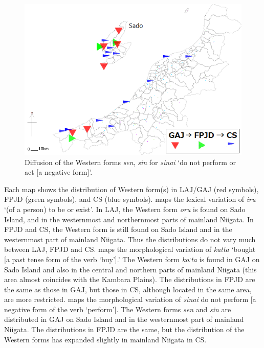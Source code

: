 \documentclass[output=paper]{LSP/langsci}
\begin{document}
\begin{figure}
\includegraphics[width=.75\textwidth]{illustrations/fuku2_fig2c}
\caption{Diffusion of the Western forms \textit{sen}, \textit{sin} for \textit{sinai} `do not perform or act [a negative form]'.}
\label{fig:2c}
\end{figure}

Each map shows the distribution of Western form(s) in \textsc{LAJ}/\textsc{GAJ} (red symbols), \textsc{FPJD} (green symbols), and \textsc{CS} (blue symbols).   maps the lexical variation of \textit{iru} `(of a person) to be or exist'.  In \textsc{LAJ}, the Western form \textit{oru} is found on Sado Island, and in the westernmost and northernmost parts of mainland Niigata.  In \textsc{FPJD} and \textsc{CS}, the Western form is still found on Sado Island and in the westernmost part of mainland Niigata.  Thus the distributions do not vary much between \textsc{LAJ}, \textsc{FPJD} and \textsc{CS}.   maps the morphological variation of \textit{katta} `bought [a past tense form of the verb `buy'].'  The Western form \textit{koːta} is found in \textsc{GAJ} on Sado Island and also in the central and northern parts of mainland Niigata (this area almost coincides with the Kambara Plains).  The distributions in \textsc{FPJD} are the same as those in \textsc{GAJ}, but those in \textsc{CS}, although located in the same area, are more restricted.   maps the morphological variation of \textit{sinai} {\textquotedbl}do not perform [a negative form of the verb `perform'].{\textquotedbl} The Western forms \textit{sen} and \textit{sin} are distributed in \textsc{GAJ} on Sado Island and in the westernmost part of mainland Niigata. The distributions in \textsc{FPJD} are the same, but the distribution of the Western forms has expanded slightly  in mainland Niigata in \textsc{CS}.
\end{document}
